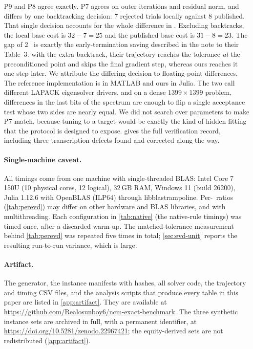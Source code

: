 P9 and P8 agree exactly. P7 agrees on outer iterations and residual norm, and
differs by one backtracking decision: 7 rejected trials locally against 8
published. That single decision accounts for the whole difference in \EVDs.
Excluding backtracks, the local base cost is $32-7=25$ and the published base
cost is $31-8=23$. The gap of 2 \EVDs\ is exactly the early-termination saving
described in the note to their Table~3: with the extra backtrack, their
trajectory reaches the tolerance \emph{at} the preconditioned point and skips
the final gradient step, whereas ours reaches it one step later. We attribute
the differing decision to floating-point differences. The reference
implementation is in MATLAB and ours in Julia. The two call different LAPACK
eigensolver drivers, and on a dense $1399\times1399$ problem, differences in
the last bits of the spectrum are enough to flip a single acceptance test
whose two sides are nearly equal. We did not search over parameters to make
P7 match, because tuning to a target would be exactly the kind of hidden
fitting that the protocol is designed to expose.  gives the full verification
record, including three transcription defects found and corrected along the
way.

\paragraph{Single-machine caveat.}
All timings come from one machine with single-threaded BLAS: Intel Core 7
150U (10 physical cores, 12 logical), 32\,GB RAM, Windows 11 (build 26200),
Julia 1.12.6 with OpenBLAS (ILP64) through libblastrampoline. Per-\EVD\ ratios
(\cref{tab:perevd}) may differ on other hardware and BLAS libraries, and with
multithreading.
Each configuration in \cref{tab:native} (the native-rule timings) was timed
once, after a discarded warm-up. The matched-tolerance measurement behind
\cref{tab:perevd} was repeated five times in total; \cref{sec:evd-unit} reports the resulting
run-to-run variance, which is large.

\paragraph{Artifact.}
The generator, the instance manifests with hashes, all solver code, the
trajectory and timing CSV files, and the analysis scripts that produce every
table in this paper are listed in \cref{app:artifact}.
They are available at \url{https://github.com/Realosunboy6/ncm-exact-benchmark}. The three
synthetic instance sets are archived in full, with a permanent identifier, at
\url{https://doi.org/10.5281/zenodo.22967421}; the equity-derived sets are not
redistributed (\cref{app:artifact}).
